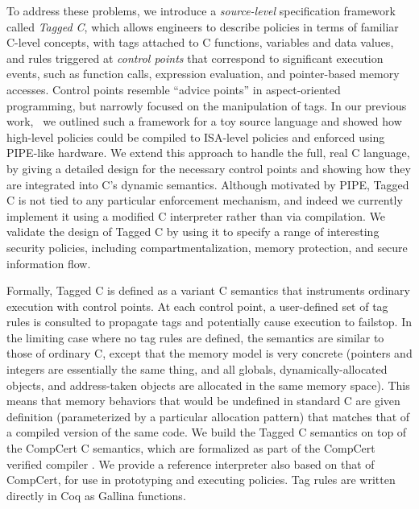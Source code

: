 \documentclass{llncs}
\begin{document}
To address these problems, we introduce a \emph{source-level} specification framework called \emph{Tagged C},
which allows engineers to describe policies in terms of familiar C-level concepts, with tags attached to
C functions, variables and data values, and rules triggered at \emph{control points} that correspond to
significant execution events, such as function calls, expression evaluation, and pointer-based memory accesses. 
Control points resemble ``advice points'' in aspect-oriented programming, but narrowly
focused on the manipulation of tags.
In our previous work,~\cite{Chhak21:Tagine} we outlined such a framework for a toy
source language and showed how high-level policies could be compiled to ISA-level policies and 
enforced using PIPE-like hardware.  We extend this approach to handle
the full, real C language, by giving a detailed design for the necessary control points and
showing how they are integrated into C's dynamic semantics. 
Although motivated by PIPE, Tagged C is not tied to any particular enforcement mechanism,
and indeed we currently implement it using a modified C interpreter rather than via compilation.
We validate the design of Tagged C by using it to specify a range of interesting security policies,
including compartmentalization, memory protection, and secure information flow.


Formally, Tagged C is defined as a variant C semantics that instruments ordinary execution with control points.
At each control point, a user-defined set of tag rules is consulted to propagate tags and potentially cause
execution to failstop. In the limiting case where no tag rules are defined, the semantics are similar to
those of ordinary C, except that the memory model is very concrete
(pointers and integers are essentially the same thing, and all globals, dynamically-allocated objects,
and address-taken objects are allocated in the same memory space). This means that memory behaviors
that would be undefined in standard C are given definition (parameterized by a particular allocation pattern)
that matches that of a compiled version of the same code.
We build the Tagged C semantics on top of the CompCert C semantics, which are formalized 
as part of the CompCert verified compiler \cite{Leroy09:CompCert}. We provide a reference interpreter
also based on that of CompCert, for use in prototyping and executing policies. Tag rules are written directly
in Coq as Gallina functions.
\end{document}
